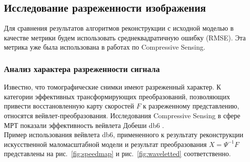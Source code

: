 \documentclass[14pt]{matmex-diploma}
\begin{document}
\subsection{Исследование разреженности изображения}
Для сравнения результатов алгоритмов реконструкции с исходной моделью в качестве метрики будем использовать среднеквадратичную ошибку (RMSE). Эта метрика уже была использована в работах по Compressive Sensing.


\subsubsection{Анализ характера разреженности сигнала} \label{sec:s_analysis}
Известно, что томографические снимки имеют разреженный характер. К категории эффективных трансформирующих преобразований, позволяющих привести восстановленную карту скоростей $F$ к разреженному представлению, относятся вейвлет-преобразования. Исследования Compressive Sensing в сфере МРТ показали эффективность вейвлета Добеши db6 \cite{lustig2007sparse}. \\
Пример использования вейвлета db6, примененного к результату реконструкции искусственной маломасштабной модели и результат преобразования $X = \Psi^{-1} F$ представлены на рис.~\ref{fig:speedmap} и рис.~\ref{fig:waveletted} соответственно.\\
\end{document}

